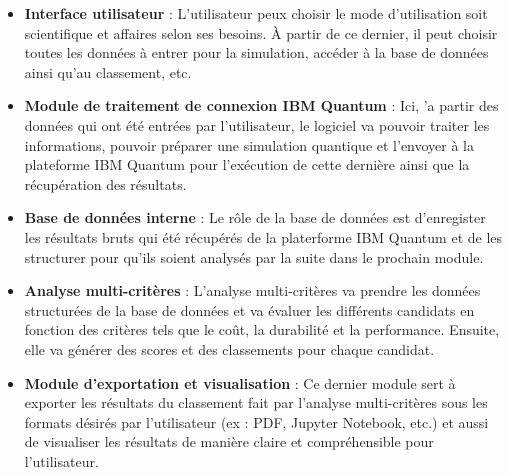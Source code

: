 \documentclass[11pt]{article}
\begin{document}
\begin{itemize}
  \item \textbf{Interface utilisateur} : L'utilisateur peux choisir le mode d'utilisation soit scientifique et affaires selon ses besoins. À partir de ce dernier, il peut choisir toutes les données à entrer pour la simulation, accéder à la base de données ainsi qu'au classement, etc.
  \item \textbf{Module de traitement de connexion IBM Quantum} : Ici, 'a partir des données qui ont été entrées par l'utilisateur, le logiciel va pouvoir traiter les informations, pouvoir préparer une simulation quantique et l'envoyer à la plateforme IBM Quantum pour l'exécution de cette dernière ainsi que la récupération des résultats. 
  \item \textbf{Base de données interne} : Le rôle de la base de données est d'enregister les résultats bruts qui été récupérés de la platerforme IBM Quantum et de les structurer pour qu'ils soient analysés par la suite dans le prochain module.
  \item \textbf{Analyse multi-critères} : L'analyse multi-critères va prendre les données structurées de la base de données et va évaluer les différents candidats en fonction des critères tels que le coût, la durabilité et la performance. Ensuite, elle va générer des scores et des classements pour chaque candidat.
  \item \textbf{Module d'exportation et visualisation} : Ce dernier module sert à exporter les résultats du classement fait par l'analyse multi-critères sous les formats désirés par l'utilisateur (ex : PDF, Jupyter Notebook, etc.) et aussi de visualiser les résultats de manière claire et compréhensible pour l'utilisateur.
\end{itemize}

\newpage
\end{document}
